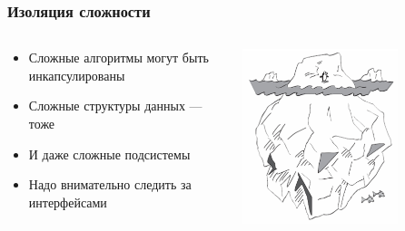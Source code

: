 \documentclass{../../slides-style}
\begin{document}
    \begin{frame}
        \frametitle{Изоляция сложности}
        \begin{columns}
            \begin{column}{0.6\textwidth}
                \begin{itemize}
                    \item Сложные алгоритмы могут быть инкапсулированы
                    \item Сложные структуры данных --- тоже
                    \item И даже сложные подсистемы
                    \item Надо внимательно следить за интерфейсами
                \end{itemize}
            \end{column}
            \begin{column}{0.4\textwidth}
                \includegraphics[width=0.7\textwidth]{complexity.png}
            \end{column}
        \end{columns}
    \end{frame}
\end{document}
